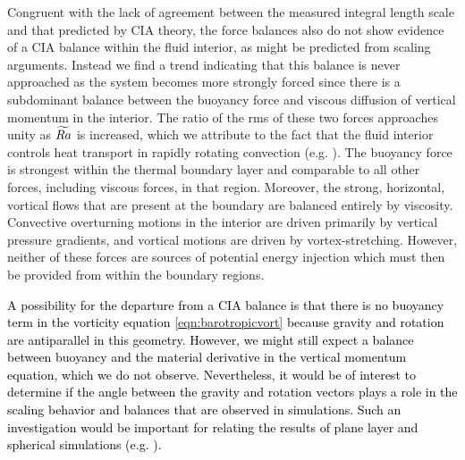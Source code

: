 Congruent with the lack of agreement between the measured integral length scale and that predicted by CIA theory, the force balances also do not show evidence of a CIA balance within the fluid interior, as might be predicted from scaling arguments. Instead we find a trend indicating that this balance is never approached as the system becomes more strongly forced since there is a subdominant balance between the buoyancy force and viscous diffusion of vertical momentum in the interior. The ratio of the rms of these two forces approaches unity as $\widetilde{Ra}$ is increased, which we attribute to the fact that the fluid interior controls heat transport in rapidly rotating convection (e.g. \citep{kJ12b}). The buoyancy force is strongest within the thermal boundary layer and comparable to all other forces, including viscous forces, in that region. Moreover, the strong, horizontal, vortical flows that are present at the boundary are balanced entirely by viscosity. Convective overturning motions in the interior are driven primarily by vertical pressure gradients, and vortical motions are driven by vortex-stretching. However, neither of these forces are sources of potential energy injection which must then be provided from within the boundary regions.

	\textcolor{black}{
	A possibility for the departure from a CIA balance is that there is no buoyancy term in the vorticity equation \eqref{eqn:barotropicvort} because gravity and rotation are antiparallel in this geometry. However, we might still expect a balance between buoyancy and the material derivative in the vertical momentum equation, which we do not observe. Nevertheless, it would be of interest to determine if the angle between the gravity and rotation vectors plays a role in the scaling behavior and balances that are observed in simulations. Such an investigation would be important for relating the results of plane layer and spherical simulations (e.g. \citep{tG23}). }
	



